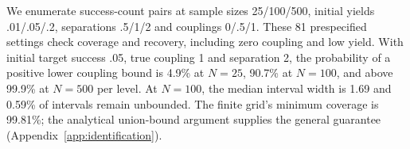 We enumerate success-count pairs at sample sizes 25/100/500, initial yields .01/.05/.2, separations .5/1/2 and couplings 0/.5/1. These 81 prespecified settings check coverage and recovery, including zero coupling and low yield. With initial target success .05, true coupling 1 and separation 2, the probability of a positive lower coupling bound is 4.9\% at $N=25$, 90.7\% at $N=100$, and above 99.9\% at $N=500$ per level. At $N=100$, the median interval width is 1.69 and 0.59\% of intervals remain unbounded. The finite grid's minimum coverage is 99.81\%; the analytical union-bound argument supplies the general guarantee (Appendix~\ref{app:identification}).

